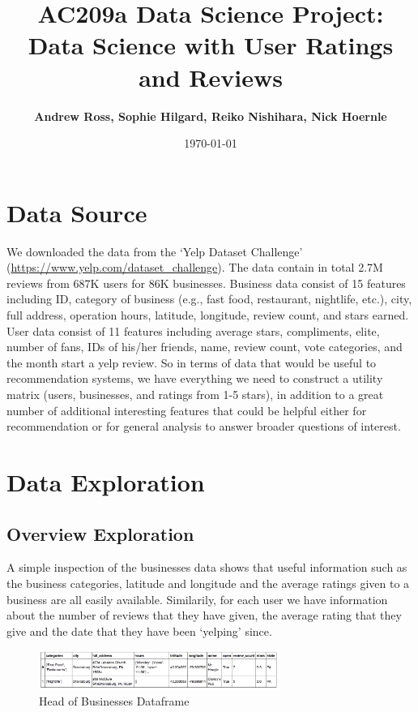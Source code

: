\documentclass[11pt]{article}
\title{
\vspace{1cm}
\textmd{\textbf{AC209a Data Science Project: Data Science with User Ratings and Reviews}}\\
}
\author{\textbf{Andrew Ross, Sophie Hilgard, Reiko Nishihara, Nick Hoernle}}
\date{\today} %
\begin{document}
\maketitle

\section*{Data Source}

We downloaded the data from the `Yelp Dataset Challenge' (\url{https://www.yelp.com/dataset_challenge}). The data contain in total 2.7M reviews from 687K users for 86K businesses. Business data consist of 15 features including ID, category of business (e.g., fast food, restaurant, nightlife, etc.), city, full address, operation hours, latitude, longitude, review count, and stars earned. User data consist of 11 features including average stars, compliments, elite, number of fans, IDs of his/her friends, name, review count, vote categories, and the month start a yelp review. So in terms of data that would be useful to recommendation systems, we have everything we need to construct a utility matrix (users, businesses, and ratings from 1-5 stars), in addition to a great number of additional interesting features that could be helpful either for recommendation or for general analysis to answer broader questions of interest.

\section*{Data Exploration}

\subsection*{Overview Exploration}

\par A simple inspection of the businesses data shows that useful information such as the business categories, latitude and longitude and the average ratings given to a business are all easily available. Similarily, for each user we have information about the number of reviews that they have given, the average rating that they give and the date that they have been `yelping' since.

\begin{figure}[H]
\centering
\includegraphics[width=0.7\textwidth]{./ac209/business-dataframe-simplified.png}
\caption{Head of Businesses Dataframe}
\end{figure}
\end{document}
